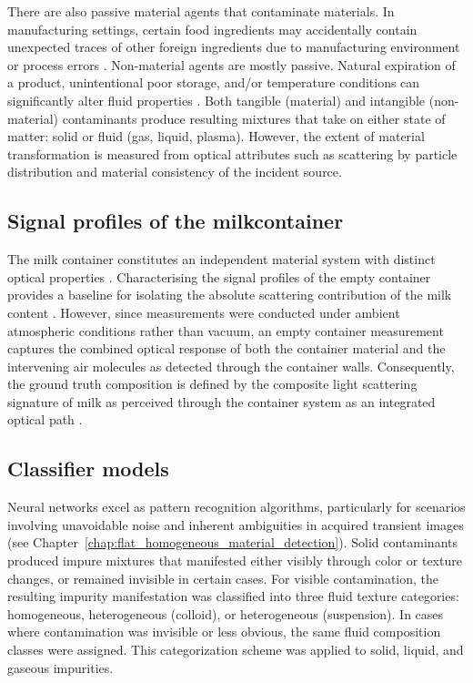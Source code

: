 \documentclass[12pt,a4paper,oneside]{report}
\begin{document}
There are also passive material agents that contaminate materials. In manufacturing settings, certain food ingredients may accidentally contain unexpected traces of other foreign ingredients due to manufacturing environment or process errors \cite{goodman1986}. Non-material agents are mostly passive. Natural expiration of a product, unintentional poor storage, and/or temperature conditions can significantly alter fluid properties \cite{lott2023,burgwald1947}. Both tangible (material) and intangible (non-material) contaminants produce resulting mixtures that take on either state of matter: solid or fluid (gas, liquid, plasma). However, the extent of material transformation is measured from optical attributes such as scattering by particle distribution and material consistency of the incident source.


\subsection{ Signal profiles of the milkcontainer}
\label{subsec:signal_profiles_of_the_milkcontainer}

The milk container constitutes an independent material system with distinct optical properties \cite{klocek1991}. Characterising the signal profiles of the empty container provides a baseline for isolating the absolute scattering contribution of the milk content \cite{aernouts2015,melfsen2012}. However, since measurements were conducted under ambient atmospheric conditions rather than vacuum, an empty container measurement captures the combined optical response of both the container material and the intervening air molecules as detected through the container walls. Consequently, the ground truth composition is defined by the composite light scattering signature of milk as perceived through the container system as an integrated optical path \cite{nielsen2013,walstra1999}.

\subsection{Classifier models}
\label{subsec:classifier_models_chapter_6}

Neural networks excel as pattern recognition algorithms, particularly for scenarios involving unavoidable noise and inherent ambiguities in acquired transient images \cite{lecun1998,su2016} (see Chapter~\ref{chap:flat_homogeneous_material_detection}). Solid contaminants produced impure mixtures that manifested either visibly through color or texture changes, or remained invisible in certain cases. For visible contamination, the resulting impurity manifestation was classified into three fluid texture categories: homogeneous, heterogeneous (colloid), or heterogeneous (suspension). In cases where contamination was invisible or less obvious, the same fluid composition classes were assigned. This categorization scheme was applied to solid, liquid, and gaseous impurities.
\end{document}
